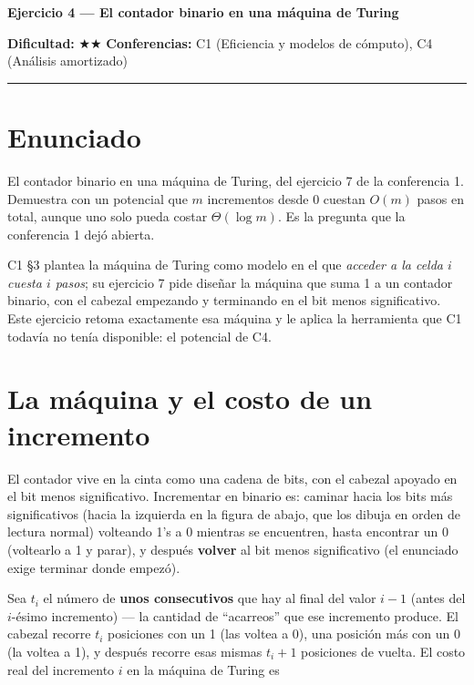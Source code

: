 \documentclass[11pt]{article}
\begin{document}
{\LARGE\bfseries\color{azultitulo} Ejercicio 4 --- El contador binario en una máquina de Turing}

\vspace{2pt}
\textbf{Dificultad:} $\bigstar\bigstar$ \quad \textbf{Conferencias:} C1 (Eficiencia y modelos de cómputo),
C4 (Análisis amortizado)
\vspace{8pt}
\hrule
\vspace{12pt}

\section*{Enunciado}
\begin{enunciado}
El contador binario en una máquina de Turing, del ejercicio 7 de la conferencia 1. Demuestra con un
potencial que $m$ incrementos desde 0 cuestan $O(m)$ pasos en total, aunque uno solo pueda costar
$\Theta(\log m)$. Es la pregunta que la conferencia 1 dejó abierta.
\end{enunciado}

C1 §3 plantea la máquina de Turing como modelo en el que \emph{acceder a la celda $i$ cuesta $i$ pasos}; su
ejercicio 7 pide diseñar la máquina que suma 1 a un contador binario, con el cabezal empezando y terminando
en el bit menos significativo. Este ejercicio retoma exactamente esa máquina y le aplica la herramienta que
C1 todavía no tenía disponible: el potencial de C4.

\section{La máquina y el costo de un incremento}

El contador vive en la cinta como una cadena de bits, con el cabezal apoyado en el bit menos significativo.
Incrementar en binario es: caminar hacia los bits más significativos (hacia la izquierda en la figura de
abajo, que los dibuja en orden de lectura normal) volteando 1's a 0 mientras se encuentren, hasta
encontrar un 0 (voltearlo a 1 y parar), y después \textbf{volver} al bit menos significativo (el enunciado
exige terminar donde empezó).

Sea $t_i$ el número de \textbf{unos consecutivos} que hay al final del valor $i-1$ (antes del $i$-ésimo
incremento) --- la cantidad de ``acarreos'' que ese incremento produce. El cabezal recorre $t_i$ posiciones
con un 1 (las voltea a 0), una posición más con un 0 (la voltea a 1), y después recorre esas mismas
$t_i+1$ posiciones de vuelta. El costo real del incremento $i$ en la máquina de Turing es
\end{document}
